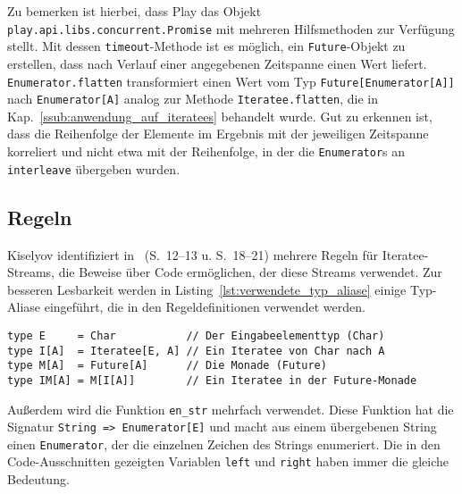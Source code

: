 Zu bemerken ist hierbei, dass Play das Objekt \lstinline|play.api.libs.concurrent.Promise| mit mehreren Hilfsmethoden zur Verfügung stellt.
Mit dessen \lstinline|timeout|-Methode ist es möglich, ein \lstinline|Future|-Objekt zu erstellen, dass nach Verlauf einer angegebenen Zeitspanne einen Wert liefert.
\lstinline|Enumerator.flatten| transformiert einen Wert vom Typ \lstinline|Future[Enumerator[A]]| nach \lstinline|Enumerator[A]| analog zur Methode \lstinline|Iteratee.flatten|, die in Kap.~\ref{ssub:anwendung_auf_iteratees} behandelt wurde.
Gut zu erkennen ist, dass die Reihenfolge der Elemente im Ergebnis mit der jeweiligen Zeitspanne korreliert und nicht etwa mit der Reihenfolge, in der die \lstinline|Enumerator|s an \lstinline|interleave| übergeben wurden.




\subsection{Regeln} %
\label{sub:regeln}

Kiselyov identifiziert in \citealt{kiselyov2012}~(S.~12--13 u. S.~18--21) mehrere Regeln für Iteratee-Streams, die Beweise über Code ermöglichen, der diese Streams verwendet.
Zur besseren Lesbarkeit werden in Listing~\ref{lst:verwendete_typ_aliase} einige Typ-Aliase eingeführt, die in den Regeldefinitionen verwendet werden.

\begin{lstlisting}[caption=Typ-Aliase der Regeln, label=lst:verwendete_typ_aliase]
type E     = Char           // Der Eingabeelementtyp (Char)
type I[A]  = Iteratee[E, A] // Ein Iteratee von Char nach A
type M[A]  = Future[A]      // Die Monade (Future)
type IM[A] = M[I[A]]        // Ein Iteratee in der Future-Monade
\end{lstlisting}

Außerdem wird die Funktion \lstinline|en_str| mehrfach verwendet.
Diese Funktion hat die Signatur \lstinline|String => Enumerator[E]| und macht aus einem übergebenen String einen \lstinline|Enumerator|, der die einzelnen Zeichen des Strings enumeriert.
Die in den Code-Ausschnitten gezeigten Variablen \lstinline|left| und \lstinline|right| haben immer die gleiche Bedeutung.

